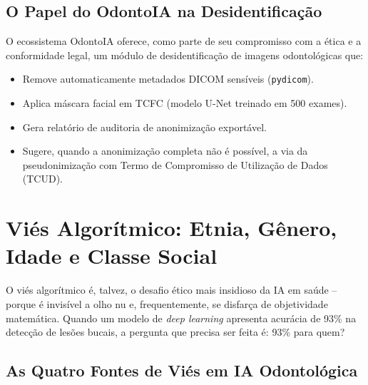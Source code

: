 \subsection{O Papel do OdontoIA na Desidentificação}

O ecossistema OdontoIA oferece, como parte de seu compromisso com a ética e a
conformidade legal, um módulo de desidentificação de imagens odontológicas que:

\begin{itemize}
  \item Remove automaticamente metadados DICOM sensíveis (\texttt{pydicom}).
  \item Aplica máscara facial em TCFC (modelo U-Net treinado em 500 exames).
  \item Gera relatório de auditoria de anonimização exportável.
  \item Sugere, quando a anonimização completa não é possível, a via da
    pseudonimização com Termo de Compromisso de Utilização de Dados (TCUD).
\end{itemize}

\section{Viés Algorítmico: Etnia, Gênero, Idade e Classe Social}
\label{sec:vies-algoritmico}

\nivelcinco

O viés algorítmico é, talvez, o desafio ético mais insidioso da IA em saúde --
porque é invisível a olho nu e, frequentemente, se disfarça de objetividade
matemática. Quando um modelo de \textit{deep learning} apresenta acurácia de
93\% na detecção de lesões bucais, a pergunta que precisa ser feita é:
93\% para quem?


\subsection{As Quatro Fontes de Viés em IA Odontológica}

